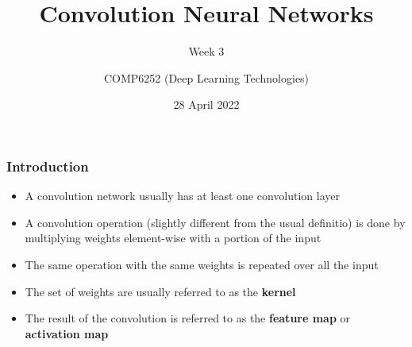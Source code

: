 \documentclass{beamer}
\begin{document}
\title{Convolution Neural Networks}
\subtitle{Week 3}
\author{COMP6252 (Deep Learning Technologies)}
 \date{28 April 2022}

\begin{frame}
    \placelogofalse %
    \titlepage
\end{frame}
    
\placelogotrue
\begin{frame}
    \frametitle{Introduction}
    \begin{itemize}
    \item A convolution network usually has at least one convolution layer
    \item A convolution operation (slightly different from the usual definitio) is done by multiplying weights element-wise with a portion of the input
    \item The same operation with the same weights is repeated over all the input
    \item The set of weights are usually referred to as the \textbf{kernel}
    \item The result of the convolution is referred to as the \textbf{feature map} or \textbf{activation map}
    \end{itemize}
  \end{frame}
\end{document}

